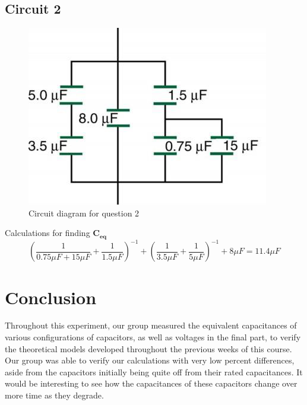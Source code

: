 \documentclass[titlepage]{article}
\begin{document}
    
    	\subsection{Circuit 2}
        \FloatBarrier
        \begin{figure}[hbt!]
            \centering
            \caption{Circuit diagram for question 2}
            \includegraphics{questions/2}
        \end{figure}
        \FloatBarrier

    {{Calculations for finding $\mathbf{C_{eq}}$}}
        $$\left( \frac{1}{0.75\mu F+15\mu F}+\frac{1}{1.5\mu F} \right)^{-1}+\left(\frac{1}{3.5\mu F}+\frac{1}{5\mu F}\right)^{-1}+8\mu F  = 11.4 \mu F$$


    
    
  	\section{Conclusion}
    Throughout this experiment, our group measured the equivalent capacitances of various configurations of capacitors, as well as voltages in the final part, to verify the theoretical models developed throughout the previous weeks of this course. Our group was able to verify our calculations with very low percent differences, aside from the capacitors initially being quite off from their rated capacitances. It would be interesting to see how the capacitances of these capacitors change over more time as they degrade.
\end{document}
